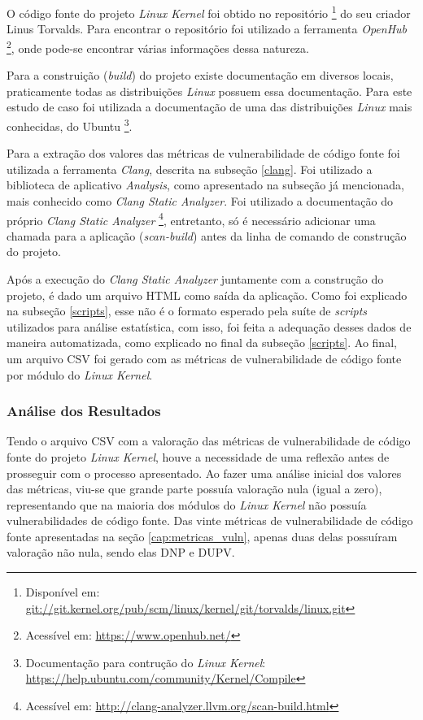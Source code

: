 O código fonte do projeto \emph{Linux Kernel} foi obtido no repositório \footnote{Disponível em:
\url{git://git.kernel.org/pub/scm/linux/kernel/git/torvalds/linux.git}} do seu
criador Linus Torvalds. Para encontrar o repositório foi utilizado a ferramenta
\emph{OpenHub} \footnote{Acessível em: \url{https://www.openhub.net/}}, onde
pode-se encontrar várias informações dessa natureza.

Para a construição (\textit{build}) do projeto existe documentação em diversos
locais, praticamente todas as distribuições \emph{Linux} possuem essa
documentação. Para este estudo de caso foi utilizada a documentação de uma das
distribuições \emph{Linux} mais conhecidas, do Ubuntu \footnote{Documentação para
  contrução do \emph{Linux Kernel}:
\url{https://help.ubuntu.com/community/Kernel/Compile}}.

Para a extração dos valores das métricas de vulnerabilidade de código fonte foi
utilizada a ferramenta \emph{Clang}, descrita na subseção
\ref{clang}. Foi utilizado a biblioteca de aplicativo
\textit{Analysis}, como apresentado na subseção já mencionada, mais conhecido como \emph{Clang Static
Analyzer}. Foi utilizado a documentação do próprio \emph{Clang Static Analyzer}
\footnote{Acessível em: \url{http://clang-analyzer.llvm.org/scan-build.html}},
entretanto, só é necessário adicionar uma chamada para a aplicação
(\textit{scan-build}) antes da linha de comando de construção do projeto.

Após a execução do \emph{Clang Static Analyzer} juntamente com a construção do
projeto, é dado um arquivo HTML como saída da aplicação. Como foi explicado na
subseção \ref{scripts}, esse não é o formato esperado pela suíte de
\textit{scripts} utilizados para análise estatística, com isso, foi feita a
adequação desses dados de maneira automatizada, como explicado no final da
subseção \ref{scripts}. Ao final, um arquivo CSV foi gerado com as métricas de
vulnerabilidade de código fonte por módulo do \emph{Linux Kernel}.

\subsubsection{Análise dos Resultados}

Tendo o arquivo CSV com a valoração das métricas de vulnerabilidade de código
fonte do projeto \emph{Linux Kernel}, houve a necessidade de uma reflexão antes
de prosseguir com o processo apresentado. Ao
fazer uma análise inicial dos valores das métricas, viu-se que grande parte
possuía valoração nula (igual a zero), representando que na maioria dos módulos
do \emph{Linux Kernel} não possuía vulnerabilidades de código fonte. Das vinte
métricas de vulnerabilidade de código fonte apresentadas na seção
\ref{cap:metricas_vuln}, apenas duas delas possuíram valoração não nula, sendo
elas DNP e DUPV. 


